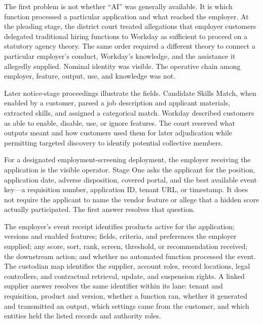 The first problem is not whether ``AI'' was generally available. It is which function processed a particular application and what reached the employer. At the pleading stage, the district court treated allegations that employer customers delegated traditional hiring functions to Workday as sufficient to proceed on a statutory agency theory. The same order required a different theory to connect a particular employer's conduct, Workday's knowledge, and the assistance it allegedly supplied. Nominal identity was visible. The operative chain among employer, feature, output, use, and knowledge was not.

Later notice-stage proceedings illustrate the fields. Candidate Skills Match, when enabled by a customer, parsed a job description and applicant materials, extracted skills, and assigned a categorical match. Workday described customers as able to enable, disable, use, or ignore features. The court reserved what outputs meant and how customers used them for later adjudication while permitting targeted discovery to identify potential collective members.

For a designated employment-screening deployment, the employer receiving the application is the visible operator. Stage One asks the applicant for the position, application date, adverse disposition, covered portal, and the best available event key---a requisition number, application ID, tenant URL, or timestamp. It does not require the applicant to name the vendor feature or allege that a hidden score actually participated. The first answer resolves that question.

The employer's event receipt identifies products active for the application; versions and enabled features; fields, criteria, and preferences the employer supplied; any score, sort, rank, screen, threshold, or recommendation received; the downstream action; and whether no automated function processed the event. The custodian map identifies the supplier, account roles, record locations, legal controllers, and contractual retrieval, update, and suspension rights. A linked supplier answer resolves the same identifier within its lane: tenant and requisition, product and version, whether a function ran, whether it generated and transmitted an output, which settings came from the customer, and which entities held the listed records and authority roles.

